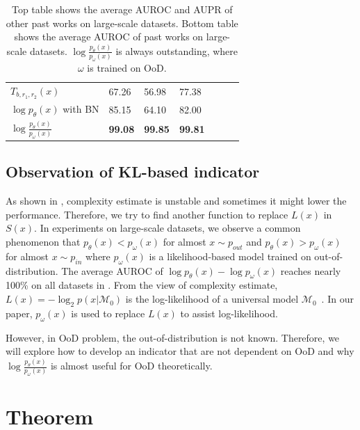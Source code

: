 \documentclass[letterpaper]{article} %
\newcommand{\pin}{p_{in}}
\newcommand{\pout}{p_{out}}
\begin{document}
\begin{table}[t]
\begin{tabular}{lllllll}
$T_{b, r_1, r_2}(x)$ & 67.26 & 56.98 & 77.38 \\
$\log p_\theta(x)$ with BN & 85.15 & 64.10 & 82.00 \\
$\log \frac{p_\theta(x)}{p_\omega(x)}$ & \textbf{99.08} & \textbf{99.85} & \textbf{99.81} \\
\bottomrule
\end{tabular}
\caption{Top table shows the average AUROC and AUPR of other past works on large-scale datasets. Bottom table shows the average AUROC of past works on large-scale datasets. $\log \frac{p_\theta(x)}{p_\omega(x)}$ is always outstanding, where $\omega$ is trained on OoD. 
}
\label{tab2}
\end{table}

\subsection{Observation of KL-based indicator}
As shown in , complexity estimate is unstable and sometimes it might lower the performance. Therefore, we try to find another function to replace $L(x)$ in $S(x)$. 
In experiments on large-scale datasets, we observe a common phenomenon that $p_\theta(x) < p_\omega(x)$ for almost $x \sim \pout$ and $p_\theta(x) > p_\omega(x)$ for almost $x \sim \pin$ where $p_\omega(x)$ is a likelihood-based model trained on out-of-distribution. 
The average AUROC of $\log p_\theta(x) - \log p_\omega(x)$ reaches nearly 100\% on all datasets in .
From the view of complexity estimate, $L(x) = -\log_2 p(x|\mathcal{M}_0)$ is the log-likelihood of a universal model $\mathcal{M}_0$~\cite{serra2019input}. In our paper, $p_\omega(x)$ is used to replace $L(x)$ to assist log-likelihood. 

However, in OoD problem, the out-of-distribution is not known. 
Therefore, we will explore how to develop an indicator that are not dependent on OoD and why $ \log \frac{p_\theta(x)}{p_\omega(x)}$ is almost useful for OoD theoretically. 

\section{Theorem}\label{sec5}
\end{document}
